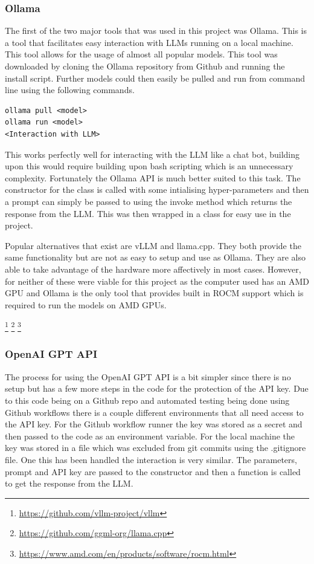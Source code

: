 \documentclass[12pt]{extarticle}
\begin{document}
\subsubsection{Ollama}

The first of the two major tools that was used in this project was Ollama. This is a tool that facilitates easy interaction with LLMs running on a local machine. This tool allows for the usage of almost all popular models. This tool was downloaded by cloning the Ollama repository from Github and running the install script. Further models could then easily be pulled and run from command line using the following commands.

\begin{verbatim}
ollama pull <model>
ollama run <model>
<Interaction with LLM>
\end{verbatim}

This works perfectly well for interacting with the LLM like a chat bot, building upon this would require building upon bash scripting which is an unnecessary complexity. Fortunately the Ollama API is much better suited to this task. The constructor for the class is called with some intialising hyper-parameters and then a prompt can simply be passed to using the invoke method which returns the response from the LLM. This was then wrapped in a class for easy use in the project.

Popular alternatives that exist are vLLM and llama.cpp. They both provide the same functionality but are not as easy to setup and use as Ollama. They are also able to take advantage of the hardware more affectively in most cases. However, for neither of these were viable for this project as the computer used has an AMD GPU and Ollama is the only tool that provides built in ROCM support which is required to run the models on AMD GPUs. 

\footnote{\url{https://github.com/vllm-project/vllm}}
\footnote{\url{https://github.com/ggml-org/llama.cpp}}
\footnote{\url{https://www.amd.com/en/products/software/rocm.html}}



\subsubsection{OpenAI GPT API}

The process for using the OpenAI GPT API is a bit simpler since there is no setup but has a few more steps in the code for the protection of the API key. Due to this code being on a Github repo and automated testing being done using Github workflows there is a couple different environments that all need access to the API key. For the Github workflow runner the key was stored as a secret and then passed to the code as an environment variable. For the local machine the key was stored in a file which was excluded from git commits using the .gitignore file. One this has been handled the interaction is very similar. The parameters, prompt and API key are passed to the constructor and then a function is called to get the response from the LLM.
\end{document}
